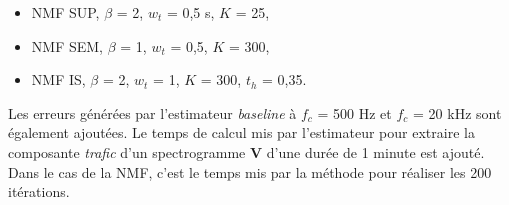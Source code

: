 \begin{itemize}
\item NMF SUP, $\beta$ = 2, $w_t$ = 0,5 s, $K$ = 25,
\item NMF SEM, $\beta$ = 1, $w_t$ = 0,5, $K$ = 300,
\item NMF IS, $\beta$ = 2, $w_t$ = 1, $K$ = 300, $t_h$ = 0,35.
\end{itemize}

Les erreurs générées par l'estimateur \textit{baseline} à $f_c$ = 500 Hz et $f_c$ = 20 kHz sont également ajoutées. Le temps de calcul mis par l'estimateur pour extraire la composante \textit{trafic} d'un spectrogramme $\mathbf{V}$ d'une durée de 1 minute est ajouté. Dans le cas de la NMF, c'est le temps mis par la méthode pour réaliser les 200 itérations. 

\begin{table}[h]
\centering
\caption{Erreurs $MAE_{60}$ selon les estimateurs NMF pour chaque méthode dans sa combinaison optimale de modalités avec les estimateurs \textit{baseline} à 500 Hz et 20 kHz. En gras-rouge, les erreurs les plus faibles, en gras-noir, les erreurs de la NMF inférieures à l'estimateur \textit{baseline} $f_c$ = 500 Hz.}
\label{tab:erreur_mae60_amb}
\end{table}

